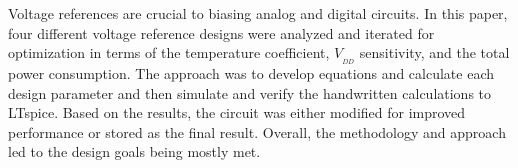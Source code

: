 Voltage references are crucial to biasing analog and digital circuits.  In this paper, four different voltage reference designs were analyzed and iterated for optimization in terms of the temperature coefficient, $V_{_{DD}}$ sensitivity, and the total power consumption.  The approach was to develop equations and calculate each design parameter and then simulate and verify the handwritten calculations to LTspice.  Based on the results, the circuit was either modified for improved performance or stored as the final result.  Overall, the methodology and approach led to the design goals being mostly met.